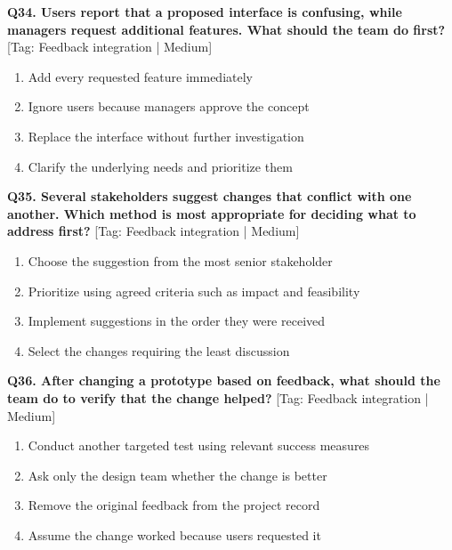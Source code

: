 \noindent\textbf{Q34. Users report that a proposed interface is confusing, while managers request additional features. What should the team do first?} \hfill [Tag: Feedback integration | Medium]
\begin{enumerate}[label=(\alph*),topsep=2pt,itemsep=1pt,partopsep=0pt,parsep=0pt]
    \item {Add every requested feature immediately}
    \item {Ignore users because managers approve the concept}
    \item {Replace the interface without further investigation}
    \item {Clarify the underlying needs and prioritize them}
\end{enumerate}
\vspace{2mm}

\noindent\textbf{Q35. Several stakeholders suggest changes that conflict with one another. Which method is most appropriate for deciding what to address first?} \hfill [Tag: Feedback integration | Medium]
\begin{enumerate}[label=(\alph*),topsep=2pt,itemsep=1pt,partopsep=0pt,parsep=0pt]
    \item {Choose the suggestion from the most senior stakeholder}
    \item {Prioritize using agreed criteria such as impact and feasibility}
    \item {Implement suggestions in the order they were received}
    \item {Select the changes requiring the least discussion}
\end{enumerate}
\vspace{2mm}

\noindent\textbf{Q36. After changing a prototype based on feedback, what should the team do to verify that the change helped?} \hfill [Tag: Feedback integration | Medium]
\begin{enumerate}[label=(\alph*),topsep=2pt,itemsep=1pt,partopsep=0pt,parsep=0pt]
    \item {Conduct another targeted test using relevant success measures}
    \item {Ask only the design team whether the change is better}
    \item {Remove the original feedback from the project record}
    \item {Assume the change worked because users requested it}
\end{enumerate}
\vspace{2mm}

